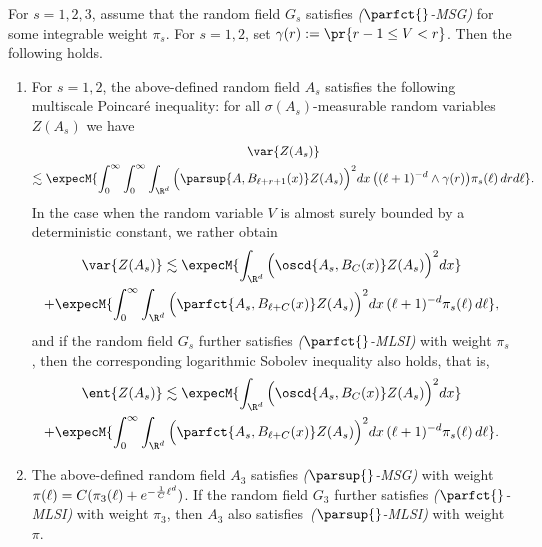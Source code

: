 \begin{prop}\label{prop:ex-dep-color}
For $s=1,2,3$, assume that the random field $G_s$ satisfies \emph{($\parfct{}$-MSG)} for some integrable weight $\pi_s$. For $s=1,2$, set $\gamma(r):=\pr{r-1\le V<r}$. Then the following holds.
\begin{enumerate}\romanenumi
\item \label{prop3.8.1}For $s=1,2$, the above-defined random field $A_s$ satisfies the following multiscale Poincaré inequality: for all $\sigma(A_s)$-measurable random variables $Z(A_s)$ we have
\begin{multline}\label{eq:s1-gen}
\var{Z(A_s)}\\
\lesssim
\expecM{\int_0^\infty\int_{0}^\infty\int_{\R^d}\Big(\parsup{A,B_{\ell+r+1}(x)}Z(A_s)\Big)^2dx\,\big((\ell+1)^{-d}\wedge\gamma(r)\big)\pi_s(\ell)\,drd\ell}.
\end{multline}
In the case when the random variable $V$ is almost surely bounded by a deterministic constant, we rather obtain
\begin{multline}\label{eq:s1-bound}
\var{Z(A_s)}\lesssim\expecM{\int_{\R^d}\Big(\oscd{A_s,B_{C}(x)}Z(A_s)\Big)^2dx}\\
+\expecM{\int_0^\infty\int_{\R^d}\Big(\parfct{A_s,B_{\ell+C}(x)}Z(A_s)\Big)^2dx\,(\ell+1)^{-d}\pi_s(\ell)\,d\ell},
\end{multline}
and if the random field $G_s$ further satisfies \emph{($\parfct{}$-MLSI)} with weight $\pi_s$, then the corresponding logarithmic Sobolev inequality also holds, that is,
\begin{multline*}
\ent{Z(A_s)}\lesssim\expecM{\int_{\R^d}\Big(\oscd{A_s,B_{C}(x)}Z(A_s)\Big)^2dx}\\
+\expecM{\int_0^\infty\int_{\R^d}\Big(\parfct{A_s,B_{\ell+C}(x)}Z(A_s)\Big)^2dx\,(\ell+1)^{-d}\pi_s(\ell)\,d\ell}.
\end{multline*}
\item \label{prop3.8.2}The above-defined random field $A_3$ satisfies \emph{($\parsup{}$-MSG)} with weight $\pi(\ell)\linebreak=C(\pi_3(\ell)+e^{-\frac1C\ell^d})$. If the random field $G_3$ further satisfies \emph{($\parfct{}$-MLSI)} with weight $\pi_3$, then $A_3$ also satisfies~\emph{($\parsup{}$-MLSI)} with weight $\pi$.
\qedhere
\end{enumerate}
\end{prop}



